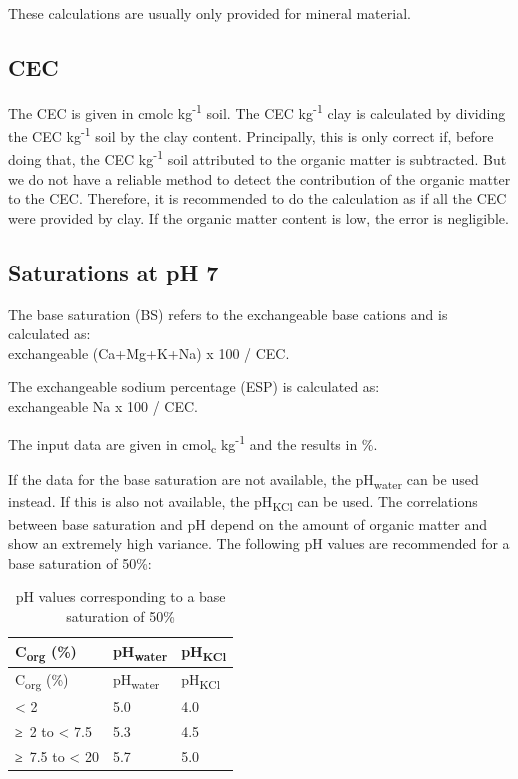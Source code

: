 \documentclass[
  letterpaper,
  DIV=11,
  numbers=noendperiod]{scrreprt}
\begin{document}
These calculations are usually only provided for mineral material.

\hypertarget{cec}{%
\subsection{CEC}\label{cec}}

The CEC is given in cmolc kg\textsuperscript{-1} soil. The CEC
kg\textsuperscript{-1} clay is calculated by dividing the CEC
kg\textsuperscript{-1} soil by the clay content. Principally, this is
only correct if, before doing that, the CEC kg\textsuperscript{-1} soil
attributed to the organic matter is subtracted. But we do not have a
reliable method to detect the contribution of the organic matter to the
CEC. Therefore, it is recommended to do the calculation as if all the
CEC were provided by clay. If the organic matter content is low, the
error is negligible.

\hypertarget{saturations-at-ph-7}{%
\subsection{Saturations at pH 7}\label{saturations-at-ph-7}}

The base saturation (BS) refers to the exchangeable base cations and is
calculated as:\\
exchangeable (Ca+Mg+K+Na) x 100 / CEC.

The exchangeable sodium percentage (ESP) is calculated as:\\
exchangeable Na x 100 / CEC.

The input data are given in cmol\textsubscript{c} kg\textsuperscript{-1}
and the results in \%.

If the data for the base saturation are not available, the
pH\textsubscript{water} can be used instead. If this is also not
available, the pH\textsubscript{KCl} can be used. The correlations
between base saturation and pH depend on the amount of organic matter
and show an extremely high variance. The following pH values are
recommended for a base saturation of 50\%:

\begin{longtable}[]{@{}lll@{}}
\caption{pH values corresponding to a base saturation of
50\%}\tabularnewline
\toprule()
C\textsubscript{org} (\%) & pH\textsubscript{water} &
pH\textsubscript{KCl} \\
\midrule()
\endfirsthead
\toprule()
C\textsubscript{org} (\%) & pH\textsubscript{water} &
pH\textsubscript{KCl} \\
\midrule()
\endhead
\textless{} 2 & 5.0 & 4.0 \\
≥~2 to \textless{} 7.5 & 5.3 & 4.5 \\
≥~7.5 to \textless{} 20 & 5.7 & 5.0 \\
\bottomrule()
\end{longtable}
\end{document}
